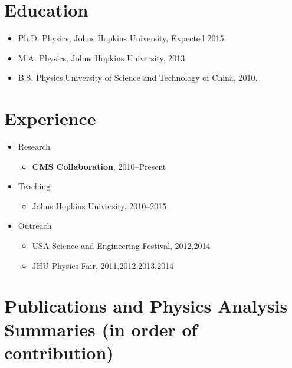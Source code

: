 \documentclass[12pt,oneside,final]{thesis}
\begin{document}



\begin{vita}



\section*{Education}

\begin{itemize}
  \item Ph.D. Physics, Johns Hopkins University, Expected 2015.
  \item M.A. Physics, Johns Hopkins University, 2013.
  \item B.S. Physics,University of Science and Technology of China, 2010.
\end{itemize}


\section*{Experience}

\begin{itemize}
\item Research
\begin{itemize}
\item \textbf{CMS Collaboration}, 2010--Present
\end{itemize}
\item Teaching
\begin{itemize}
\item Johns Hopkins University, 2010--2015
\end{itemize}
\item Outreach
\begin{itemize}
\item USA Science and Engineering Festival, 2012,2014
\item JHU Physics Fair, 2011,2012,2013,2014
\end{itemize}
\end{itemize}

\section*{Publications and Physics Analysis Summaries (in order of contribution)}


\end{vita}
\end{document}
